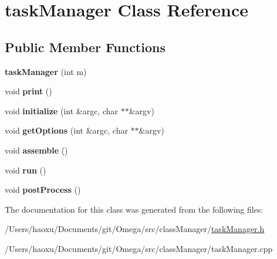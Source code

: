 \hypertarget{classtask_manager}{}\section{task\+Manager Class Reference}
\label{classtask_manager}
\subsection*{Public Member Functions}
\begin{DoxyCompactItemize}
\item 
\mbox{\label{classtask_manager_a034bd43127331a49e48593147aa7cda3}} 
{\bfseries task\+Manager} (int m)
\item 
\mbox{\label{classtask_manager_abd6f35d4dd5ad8f18f60886ba7b52e25}} 
void {\bfseries print} ()
\item 
\mbox{\label{classtask_manager_a119e482c8acafa770568ba8578445ca5}} 
void {\bfseries initialize} (int \&argc, char $\ast$$\ast$\&argv)
\item 
\mbox{\label{classtask_manager_a8d8797b3bc3691ccf7f6445e05c0f34e}} 
void {\bfseries get\+Options} (int \&argc, char $\ast$$\ast$\&argv)
\item 
\mbox{\label{classtask_manager_a584d4e55b58302308fd2d15f7ffd43c9}} 
void {\bfseries assemble} ()
\item 
\mbox{\label{classtask_manager_abef65e91b2ac2969750d0cf6979be684}} 
void {\bfseries run} ()
\item 
\mbox{\label{classtask_manager_a7cc568b0a99bc06adaa1938f38e0fb7f}} 
void {\bfseries post\+Process} ()
\end{DoxyCompactItemize}


The documentation for this class was generated from the following files\+:\begin{DoxyCompactItemize}
\item 
/\+Users/haoxu/\+Documents/git/\+Omega/src/class\+Manager/\hyperlink{task_manager_8h}{task\+Manager.\+h}\item 
/\+Users/haoxu/\+Documents/git/\+Omega/src/class\+Manager/task\+Manager.\+cpp\end{DoxyCompactItemize}
